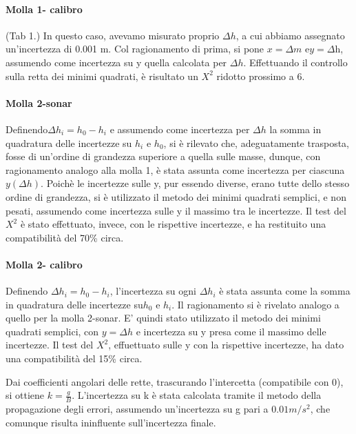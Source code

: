 \documentclass{article}
\begin{document}
\paragraph{Molla 1- calibro} (Tab 1.) 
In questo caso, avevamo  misurato proprio $\Delta h$, a cui abbiamo assegnato un'incertezza di 0.001 m. Col ragionamento di prima, si pone $x=\Delta m$ e$ y=\Delta $h, assumendo come incertezza su y quella calcolata per $\Delta h$. Effettuando il controllo sulla retta dei minimi quadrati, è risultato un $X ^2 $ ridotto prossimo a 6. 

\paragraph{Molla 2-sonar}
Definendo$ \Delta h_i = h_0-h_i$ e assumendo come incertezza per $\Delta h$ la somma in quadratura delle incertezze su $h_i$ e $h_0$, si è rilevato che, adeguatamente trasposta, fosse di un'ordine di grandezza superiore a quella sulle masse, dunque, con ragionamento analogo alla molla 1, è stata assunta come incertezza per ciascuna $y(\Delta h)$. Poichè le incertezze sulle y, pur essendo diverse, erano tutte dello stesso ordine di grandezza, si è utilizzato il metodo dei minimi quadrati semplici, e non pesati, assumendo come incertezza sulle y il massimo tra le incertezze. Il test del $X ^2 $ è stato effettuato, invece, con le rispettive incertezze, e ha restituito una compatibilità del 70\% circa.  



\paragraph{Molla 2- calibro}
Definendo $\Delta h_i=h_0-h_i$, l'incertezza su ogni $\Delta h_i$ è stata assunta come la somma in quadratura delle incertezze su$ h_0$ e $h_i$. Il ragionamento si è rivelato analogo a quello per la molla 2-sonar. E' quindi stato utilizzato il metodo dei minimi quadrati semplici, con $y=\Delta h$ e incertezza su y presa come il massimo delle incertezze. Il test del $X ^2 $,  effuettuato sulle y con la rispettive incertezze, ha dato una compatibilità del 15\% circa. 

Dai coefficienti angolari delle rette, trascurando l'intercetta (compatibile con 0), si ottiene $k=\frac{g}{B}$. L'incertezza su k è stata calcolata tramite il metodo della propagazione degli errori, assumendo un'incertezza su g pari a $0.01 m/s^2$, che comunque risulta ininfluente sull'incertezza finale. 
\end{document}
